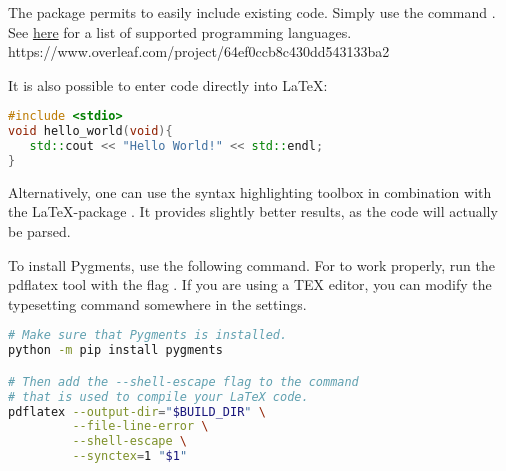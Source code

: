 The package \href{https://www.overleaf.com/learn/latex/Code\_listing}{} permits to easily include existing code. Simply use the command \verb||. See \href{https://www.overleaf.com/learn/latex/Code\_listing#Supported\_languages}{here} for a list of supported programming languages.
https://www.overleaf.com/project/64ef0ccb8c430dd543133ba2



It is also possible to enter code directly into \LaTeX:

\begin{lstlisting}[language=C++]
#include <stdio>
void hello_world(void){
   std::cout << "Hello World!" << std::endl;
}    
\end{lstlisting}

Alternatively, one can use the syntax highlighting toolbox \href{https://pygments.org/}{} in combination with the \LaTeX-package \href{www.overleaf.com/learn/latex/Code\_Highlighting\_with\_minted}{}. It provides slightly better results, as the code will actually be parsed.

To install Pygments, use the following command. For  to work properly, run the pdflatex tool with the flag . If you are using a TEX editor, you can modify the typesetting   command somewhere in the settings.

\begin{lstlisting}[language=bash]
# Make sure that Pygments is installed.
python -m pip install pygments

# Then add the --shell-escape flag to the command 
# that is used to compile your LaTeX code.
pdflatex --output-dir="$BUILD_DIR" \
         --file-line-error \
         --shell-escape \
         --synctex=1 "$1"
\end{lstlisting}




\iffalse
See below how the result looks like if minted is available on your system.

\begin{listing}[!ht]
\inputminted[linenos, bgcolor=codebackground, style=friendly]{python}{Code/example.py}
\caption{Example from external file, parsed using \code{Pygments}}
\end{listing}

\fi